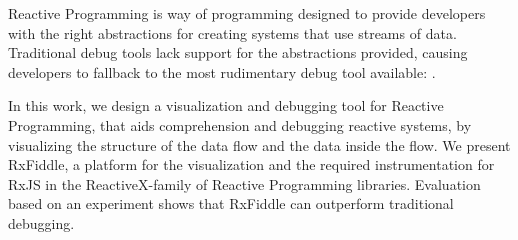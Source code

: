 Reactive Programming is way of programming designed to provide developers with the right abstractions for creating systems that use streams of data.
Traditional debug tools lack support for the abstractions provided, causing developers to fallback to the most rudimentary debug tool available: \printfdebugging{}{}.

In this work, we design a visualization and debugging tool for Reactive Programming, that aids comprehension and debugging reactive systems, by visualizing the structure of the data flow and the data inside the flow.
We present RxFiddle, a platform for the visualization and the required instrumentation for RxJS in the ReactiveX-family of Reactive Programming libraries.
Evaluation based on an experiment shows that RxFiddle can outperform traditional debugging.
